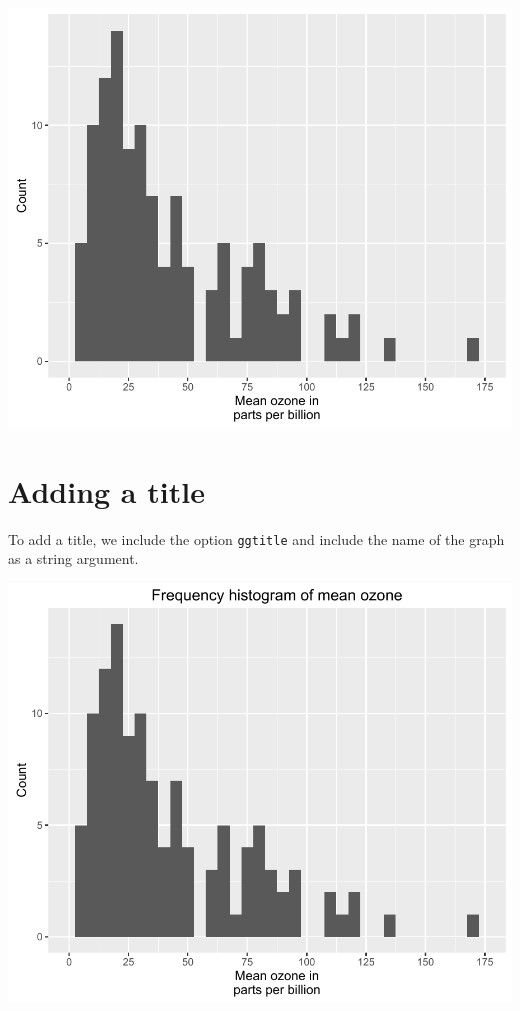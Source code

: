 \begin{center}\includegraphics[width=0.6\linewidth]{7_Histograms_pdf/histogram_7-1} \end{center}

\section{Adding a title}\label{adding-a-title}

To add a title, we include the option \texttt{ggtitle} and include the
name of the graph as a string argument.

\begin{Shaded}
\begin{Highlighting}[]
\StringTok{ }\NormalTok{(} \StringTok{ }
\StringTok{  }\NormalTok{(}\NormalTok{(}  \NormalTok{) +}
\StringTok{  }\NormalTok{(} \NormalTok{,}
     \NormalTok{(}\NormalTok{, }\NormalTok{, }\NormalTok{), }\NormalTok{(}\NormalTok{, }\NormalTok{)) +}
\StringTok{  }\NormalTok{(} \NormalTok{) +}
\StringTok{  }\NormalTok{(}\NormalTok{)}
\end{Highlighting}
\end{Shaded}

\begin{center}\includegraphics[width=0.6\linewidth]{7_Histograms_pdf/histogram_8-1} \end{center}


